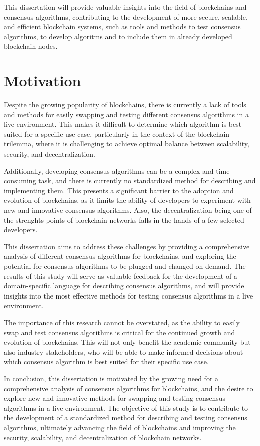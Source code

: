 This dissertation will provide valuable insights into the field of blockchains and consensus algorithms, contributing to the development of more secure, scalable, and efficient blockchain systems, such as tools and methods to test consensus algorithms, to develop algoritms and to include them in already developed blockchain nodes.

\section{Motivation}

Despite the growing popularity of blockchains, there is currently a lack of tools and methods for easily swapping and testing different consensus algorithms in a live environment.
This makes it difficult to determine which algorithm is best suited for a specific use case, particularly in the context of the blockchain trilemma, where it is challenging to achieve optimal balance between scalability, security, and decentralization.

Additionally, developing consensus algorithms can be a complex and time-consuming task, and there is currently no standardized method for describing and implementing them.
This presents a significant barrier to the adoption and evolution of blockchains, as it limits the ability of developers to experiment with new and innovative consensus algorithms. 
Also, the decentralization being one of the strenghts points of blockchain networks falls in the hands of a few selected developers.

This dissertation aims to address these challenges by providing a comprehensive analysis of different consensus algorithms for blockchains, and exploring the potential for consensus algorithms to be plugged and changed on demand.
The results of this study will serve as valuable feedback for the development of a domain-specific language for describing consensus algorithms, and will provide insights into the most effective methods for testing consensus algorithms in a live environment.

The importance of this research cannot be overstated, as the ability to easily swap and test consensus algorithms is critical for the continued growth and evolution of blockchains.
This will not only benefit the academic community but also industry stakeholders, who will be able to make informed decisions about which consensus algorithm is best suited for their specific use case.

In conclusion, this dissertation is motivated by the growing need for a comprehensive analysis of consensus algorithms for blockchains, and the desire to explore new and innovative methods for swapping and testing consensus algorithms in a live environment.
The objective of this study is to contribute to the development of a standardized method for describing and testing consensus algorithms, ultimately advancing the field of blockchains and improving the security, scalability, and decentralization of blockchain networks.

